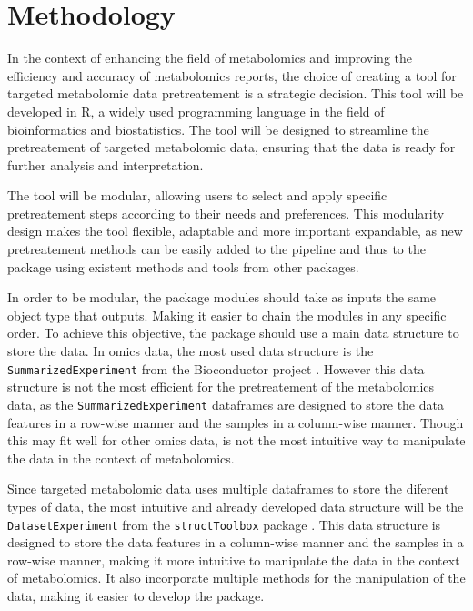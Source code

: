 \documentclass[ENG, BIB]{TFUOC}%
\begin{document}
\section{Methodology}

In the context of enhancing the field of metabolomics and improving the efficiency and accuracy of metabolomics reports, the choice of creating a tool for targeted metabolomic data pretreatement is a strategic decision. This tool will be developed in R, a widely used programming language in the field of bioinformatics and biostatistics. The tool will be designed to streamline the pretreatement of targeted metabolomic data, ensuring that the data is ready for further analysis and interpretation. 

The tool will be modular, allowing users to select and apply specific pretreatement steps according to their needs and preferences. This modularity design makes the tool flexible, adaptable and more important expandable, as new pretreatement methods can be easily added to the pipeline and thus to the package using existent methods and tools from other packages.

In order to be modular, the package modules should take as inputs the same object type that outputs. Making it easier to chain the modules in any specific order. To achieve this objective, the package should use a main data structure to store the data. In omics data, the most used data structure is the \texttt{SummarizedExperiment} from the Bioconductor project \cite{R-SummarizedExperiment}. However this data structure is not the most efficient for the pretreatement of the metabolomics data, as the \texttt{SummarizedExperiment} dataframes are designed to store the data features in a row-wise manner and the samples in a column-wise manner. Though this may fit well for other omics data, is not the most intuitive way to manipulate the data in the context of metabolomics.

Since targeted metabolomic data uses multiple dataframes to store the diferent types of data, the most intuitive and already developed data structure will be the \texttt{DatasetExperiment} from the \texttt{structToolbox} package \cite{structToolbox2020}. This data structure is designed to store the data features in a column-wise manner and the samples in a row-wise manner, making it more intuitive to manipulate the data in the context of metabolomics. It also incorporate multiple methods for the manipulation of the data, making it easier to develop the package. 
\end{document}
